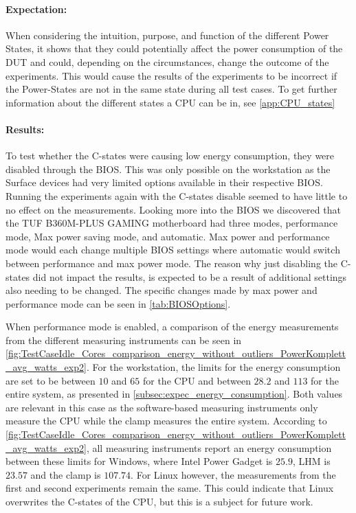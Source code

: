 \paragraph*{Expectation:} When considering the intuition, purpose, and function of the different Power States, it shows that they could potentially affect the power consumption of the DUT and could, depending on the circumstances, change the outcome of the experiments. This would cause the results of the experiments to be incorrect if the Power-States are not in the same state during all test cases. To get further information about the different states a CPU can be in, see \cref{app:CPU_states}

\paragraph*{Results:} To test whether the C-states were causing low energy consumption, they were disabled through the BIOS. This was only possible on the workstation as the Surface devices had very limited options available in their respective BIOS. Running the experiments again with the C-states disable seemed to have little to no effect on the measurements. Looking more into the BIOS we discovered that the TUF B360M-PLUS GAMING motherboard had three modes, performance mode, Max power saving mode, and automatic. Max power and performance mode would each change multiple BIOS settings where automatic would switch between performance and max power mode. The reason why just disabling the C-states did not impact the results, is expected to be a result of additional settings also needing to be changed. The specific changes made by max power and performance mode can be seen in \cref{tab:BIOSOptions}.



When performance mode is enabled, a comparison of the energy measurements from the different measuring instruments can be seen in \cref{fig:TestCaseIdle_Cores_comparison_energy_without_outliers_PowerKomplett_avg_watts_exp2}. For the workstation, the limits for the energy consumption are set to be between $10$ and $65$ for the CPU and between $28.2$ and $113$ for the entire system, as presented in \cref{subsec:expec_energy_consumption}. Both values are relevant in this case as the software-based measuring instruments only measure the CPU while the clamp measures the entire system. According to \cref{fig:TestCaseIdle_Cores_comparison_energy_without_outliers_PowerKomplett_avg_watts_exp2}, all measuring instruments report an energy consumption between these limits for Windows, where Intel Power Gadget is $25.9$, LHM is $23.57$ and the clamp is $107.74$. For Linux however, the measurements from the first and second experiments remain the same. This could indicate that Linux overwrites the C-states of the CPU, but this is a subject for future work.

